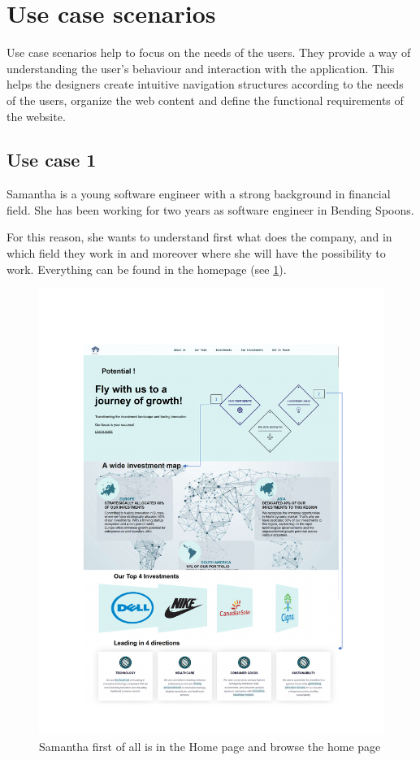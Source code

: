 \documentclass[../../DD.tex]{subfiles}
\begin{document}
	\section{Use case scenarios}
		Use case scenarios help to focus on the needs of the users. They provide a way of understanding the user's behaviour and interaction with the application. This helps the designers create intuitive navigation structures according to the needs of the users, organize the web content and define the functional requirements of the website.
  
		\subsection{Use case 1}
        Samantha is a young software engineer with a strong background in financial field. She has been working for two years as software engineer in Bending Spoons.

        For this reason, she wants to understand first what does the company, and in which field they work in and moreover where she will have the possibility to work. Everything can be found in the homepage (see \ref{fig: UC01}).

        \begin{figure}[!htb]
            \centering
            \includegraphics[width=\textwidth]{Images/scenarios/Use Case 1.pdf}
            \caption{Samantha first of all is in the Home page and browse the home page}
            \label{fig: UC01}
        \end{figure}
    
\end{document}
